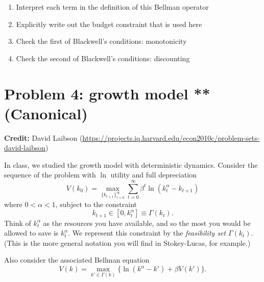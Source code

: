 \documentclass[11pt]{extarticle}
\theoremstyle{plain}
\theoremstyle{definition}
\begin{document}
\vspace{5mm}
\noindent
\begin{enumerate}
\item Interpret each term in the definition of this Bellman operator

\item Explicitly write out the budget constraint that is used here

\item Check the first of Blackwell's conditions: monotonicity

\item Check the second of Blackwell's conditions: discounting
\end{enumerate}





\vspace{10mm}
\section*{Problem 4: growth model  ** (Canonical)}

\textbf{Credit:} David Laibson (\url{https://projects.iq.harvard.edu/econ2010c/problem-sets-david-laibson})

\vspace{5mm}
\noindent
In class, we studied the growth model with deterministic dynamics. Consider the sequence of the problem with $\ln$ utility and full depreciation
\begin{equation*}
	V(k_0) = \max_{ \{ k_{t+1} \}_{t=0}^\infty} \sum_{t=0}^\infty \beta^t \ln (k_t^\alpha - k_{t+1})
\end{equation*}
where $0 < \alpha < 1$, subject to the constraint
\begin{equation*}
	k_{t+1} \in [0, k_t^\alpha] \equiv \Gamma(k_t).
\end{equation*}
Think of $k_t^\alpha$ as the resources you have available, and so the most you would be allowed to save is $k_t^\alpha$. We represent this constraint by the \textit{feasibility set} $\Gamma(k_t)$. (This is the more general notation you will find in Stokey-Lucas, for example.)

Also consider the associated Bellman equation 
\begin{equation*}
	V(k) = \max_{k' \in \Gamma(k)} \bigg\{ \ln (k^\alpha - k') + \beta V(k') \bigg\}.
\end{equation*}
\end{document}
